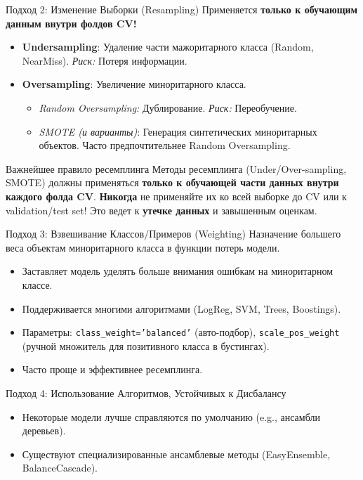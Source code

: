 \begin{myblock}{{Подход 2: Изменение Выборки (Resampling)}}
    Применяется \textbf{только к обучающим данным внутри фолдов CV!}
    \begin{itemize}[nosep, leftmargin=*]
        \item \textbf{Undersampling}: Удаление части мажоритарного класса (Random, NearMiss). \textit{Риск:} Потеря информации.
        \item \textbf{Oversampling}: Увеличение миноритарного класса.
            \begin{itemize}
                \item \textit{Random Oversampling:} Дублирование. \textit{Риск:} Переобучение.
                \item \textit{SMOTE (и варианты)}: Генерация синтетических миноритарных объектов. Часто предпочтительнее Random Oversampling.
            \end{itemize}
    \end{itemize}
\end{myblock}

\begin{alerttextbox}{Важнейшее правило ресемплинга}
    Методы ресемплинга (Under/Over-sampling, SMOTE) должны применяться \textbf{только к обучающей части данных внутри каждого фолда CV}. \textbf{Никогда} не применяйте их ко всей выборке до CV или к validation/test set! Это ведет к \textbf{утечке данных} и завышенным оценкам.
\end{alerttextbox}

\begin{myblock}{{Подход 3: Взвешивание Классов/Примеров (Weighting)}}
    Назначение большего веса объектам миноритарного класса в функции потерь модели.
    \begin{itemize}[nosep, leftmargin=*]
        \item Заставляет модель уделять больше внимания ошибкам на миноритарном классе.
        \item Поддерживается многими алгоритмами (LogReg, SVM, Trees, Boostings).
        \item Параметры: \texttt{class\_weight='balanced'} (авто-подбор), \texttt{scale\_pos\_weight} (ручной множитель для позитивного класса в бустингах).
        \item Часто проще и эффективнее ресемплинга.
    \end{itemize}
\end{myblock}

\begin{myblock}{{Подход 4: Использование Алгоритмов, Устойчивых к Дисбалансу}}
    \begin{itemize}[nosep, leftmargin=*]
        \item Некоторые модели лучше справляются по умолчанию (e.g., ансамбли деревьев).
        \item Существуют специализированные ансамблевые методы (EasyEnsemble, BalanceCascade).
    \end{itemize}
\end{myblock}

